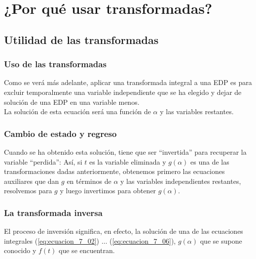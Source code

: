 \documentclass[12pt]{beamer}
\begin{document}
\section{¿Por qué usar transformadas?}
\subsection{Utilidad de las transformadas}

\begin{frame}
\frametitle{Uso de las transformadas}
Como se verá más adelante, aplicar una transformada integral a una EDP es para excluir temporalmente una variable independiente que se ha elegido y dejar de solución de una EDP en una variable menos.
\\
\bigskip
\pause
La solución de esta ecuación será una función de $\alpha$ y las variables restantes.
\end{frame}
\begin{frame}
\frametitle{Cambio de estado y regreso}
Cuando se ha obtenido esta solución, tiene que ser \enquote{invertida} para recuperar la variable \enquote{perdida}: \pause Así, si $t$ es la variable eliminada y $g (\alpha)$ es una de las transformaciones dadas anteriormente, \pause obtenemos primero las ecuaciones auxiliares que dan $g$ en términos de $\alpha$ y las variables independientes restantes, resolvemos para $g$ y luego invertimos para obtener $g (\alpha)$.
\end{frame}
\begin{frame}
\frametitle{La transformada inversa}
El proceso de inversión significa, en efecto, la solución de una de las ecuaciones integrales (\ref{eq:ecuacion_7_02}) $\ldots$ (\ref{eq:ecuacion_7_06}), $g (\alpha)$ que se supone conocido y $f (t)$ que se encuentran.
\end{frame}
\end{document}
